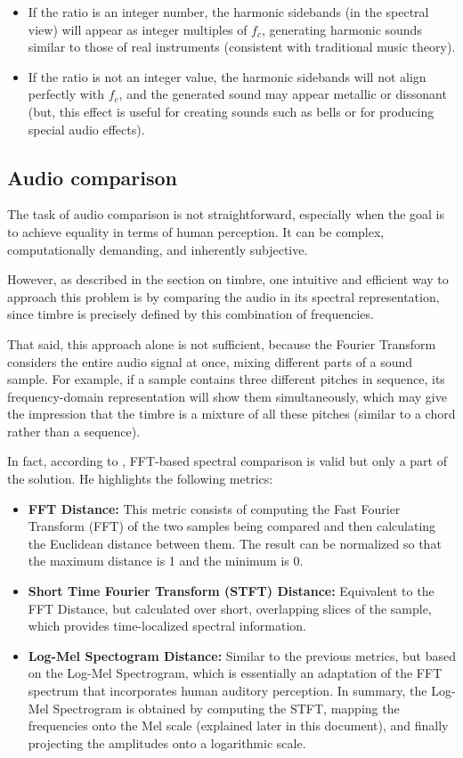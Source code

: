 \begin{itemize}
    \item If the ratio is an integer number, the harmonic sidebands (in the spectral view) will appear as integer multiples of \( f_c \), generating harmonic sounds similar to those of real instruments (consistent with traditional music theory).
    \item If the ratio is not an integer value, the harmonic sidebands will not align perfectly with \( f_c \), and the generated sound may appear metallic or dissonant (but, this effect is useful for creating sounds such as bells or for producing special audio effects).
\end{itemize}

\subsection{Audio comparison}

The task of audio comparison is not straightforward, especially when the goal is to achieve equality in terms of human perception. It can be complex, computationally demanding, and inherently subjective.

However, as described in the section on timbre, one intuitive and efficient way to approach this problem is by comparing the audio in its spectral representation, since timbre is precisely defined by this combination of frequencies.

That said, this approach alone is not sufficient, because the Fourier Transform considers the entire audio signal at once, mixing different parts of a sound sample. For example, if a sample contains three different pitches in sequence, its frequency-domain representation will show them simultaneously, which may give the impression that the timbre is a mixture of all these pitches (similar to a chord rather than a sequence).

In fact, according to \cite{claesson2021resynthesis}, FFT-based spectral comparison is valid but only a part of the solution. He highlights the following metrics:

\begin{itemize}
    \item \textbf{FFT Distance:} This metric consists of computing the Fast Fourier Transform (FFT) of the two samples being compared and then calculating the Euclidean distance between them. The result can be normalized so that the maximum distance is 1 and the minimum is 0.
    \item \textbf{Short Time Fourier Transform (STFT) Distance:} Equivalent to the FFT Distance, but calculated over short, overlapping slices of the sample, which provides time-localized spectral information.
    \item \textbf{Log-Mel Spectogram Distance:} Similar to the previous metrics, but based on the Log-Mel Spectrogram, which is essentially an adaptation of the FFT spectrum that incorporates human auditory perception. In summary, the Log-Mel Spectrogram is obtained by computing the STFT, mapping the frequencies onto the Mel scale (explained later in this document), and finally projecting the amplitudes onto a logarithmic scale.
\end{itemize}


